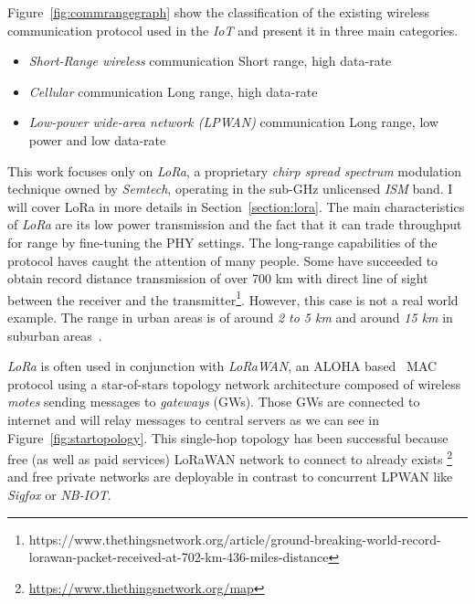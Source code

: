 Figure~\ref{fig:commrangegraph} show the classification
of the existing wireless communication protocol used in the \emph{IoT} and
present it in three main categories.

\begin{itemize}
    \item \emph{Short-Range wireless} communication Short range, high data-rate
    \item \emph{Cellular} communication Long range, high data-rate
    \item \emph{Low-power wide-area network (LPWAN)} communication Long range, low power and low data-rate
\end{itemize}



This work focuses only on \emph{LoRa}, a proprietary \emph{chirp spread spectrum}
modulation technique owned by \emph{Semtech}, operating in the sub-GHz
unlicensed \emph{ISM} band. I will cover LoRa in more details in 
Section~\ref{section:lora}.
The main characteristics of \emph{LoRa} are its low power transmission and the
fact that it can trade throughput for range by fine-tuning the PHY settings.
The long-range capabilities of the protocol haves caught the attention of
many people. 
Some have succeeded to obtain record distance transmission of over 700 km with
direct line of sight between the receiver and the
transmitter\footnote{https://www.thethingsnetwork.org/article/ground-breaking-world-record-lorawan-packet-received-at-702-km-436-miles-distance}.
However, this case is not a real world example. The range in urban areas is of
around \emph{2 to 5 km} and around \emph{15 km} in suburban
areas~\cite{8030482}.

\emph{LoRa} is often used in conjunction with \emph{LoRaWAN}, an ALOHA 
based~\cite{loraalliance:lorawanspecification} MAC protocol using a star-of-stars 
topology network architecture composed of wireless \emph{motes} sending
messages to \emph{gateways} (GWs).
Those GWs are connected to internet and will relay messages to central servers
as we can see in Figure~\ref{fig:startopology}.
This single-hop topology has been successful because free (as well as paid
services) LoRaWAN network to connect to already exists
\footnote{\url{https://www.thethingsnetwork.org/map}} and free private networks are
deployable in contrast to concurrent LPWAN like \emph{Sigfox} or \emph{NB-IOT}.

